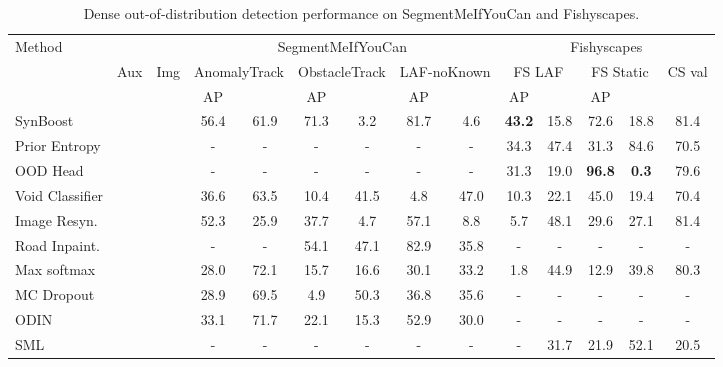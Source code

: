 \documentclass[lettersize,journal,hidelinks]{IEEEtran}
\newcommand{\cmark}{\ding{51}}
\newcommand{\xmark}{\ding{55}}
\begin{document}
\begin{table*}[ht]
\centering
 \caption{Dense out-of-distribution detection performance on SegmentMeIfYouCan and Fishyscapes.
}
\label{tbl:smiyc}
\begin{footnotesize}
\begin{tabular}{l|ccccccccccccc}
\hline\hline
\multirow{3}{*}{Method} & & & \multicolumn{6}{|c|}{SegmentMeIfYouCan \cite{chan21arxiv}} &  \multicolumn{5}{c}{Fishyscapes \cite{blum21ijcv}} \\\cline{4-14}
 & \multicolumn{1}{c}{\multirow{2}{*}{Aux}} & \multicolumn{1}{c}{\multirow{2}{*}{Img}} & \multicolumn{2}{|c|}{AnomalyTrack} & \multicolumn{2}{c|}{ObstacleTrack}
& \multicolumn{2}{c|}{LAF-noKnown} & \multicolumn{2}{c|}{FS LAF} & \multicolumn{2}{c|}{FS Static} & CS val\\
 & \multicolumn{1}{c}{data} & \multicolumn{1}{c}{rsyn.} & \multicolumn{1}{|c}{AP} & \multicolumn{1}{c|}{} & AP & \multicolumn{1}{c|}{} & AP & \multicolumn{1}{c|}{}  & AP & \multicolumn{1}{c|}{} & AP & \multicolumn{1}{c|}{} &  \\ \hline \hline
SynBoost \cite{biase21cvpr} & \cmark& \cmark & 56.4 & 61.9 & 71.3 & 3.2 & 81.7 & 4.6 & \textbf{43.2} & 15.8 & 72.6 & 18.8 & 81.4 \\
Prior Entropy \cite{malinin18nips} & \cmark & \xmark & - & - & - & - & - & - & 34.3 & 47.4 & 31.3 & 84.6 & 70.5 \\
OOD Head \cite{bevandic19gcpr} & \cmark & \xmark & - & - & - & - & - & -  & 31.3 & 19.0 & \textbf{96.8} & \textbf{0.3} & 79.6 \\
Void Classifier \cite{blum21ijcv} & \cmark& \xmark & 36.6 & 63.5 & 10.4 & 41.5 & 4.8 & 47.0 & 10.3 & 22.1 & 45.0 & 19.4 & 70.4 \\
Image Resyn. \cite{lis19iccv} & \xmark& \cmark& 52.3 & 25.9 & 37.7 & 4.7 & 57.1 & 8.8 & 5.7 & 48.1 & 29.6 & 27.1 & 81.4  \\
Road Inpaint. \cite{lis20arxiv} & \xmark& \cmark & - & -  & 54.1 & 47.1 & 82.9 & 35.8  & - & - & - & - & -  \\\hdashline
Max softmax \cite{hendrycks17iclr} & \xmark&  \xmark & 28.0 & 72.1 & 15.7 & 16.6  &  30.1 & 33.2 &  1.8 & 44.9 & 12.9 & 39.8 & 80.3 \\
MC Dropout \cite{kendall17nips} & \xmark& \xmark & 28.9 & 69.5 & 4.9 & 50.3 & 36.8 & 35.6 & - & - & - & - & - \\
ODIN \cite{liang18iclr} & \xmark&  \xmark & 33.1 & 71.7 & 22.1 & 15.3 & 52.9 & 30.0 & - & - & - & - & -  \\
SML \cite{jung21iccv} & \xmark & \xmark & - & - & - & - & - & -   & -  & 31.7 & 21.9 & 52.1 & 20.5 \\

\end{tabular}
\end{footnotesize}
\end{table*}
\end{document}

